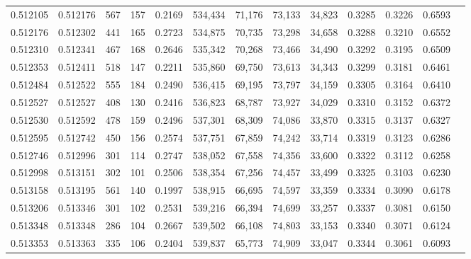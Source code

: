 \begin{tabular}{rrrrrrrrrrrrr}
0.512105 & 0.512176 &   567 &   157 &                                     0.2169 & 534,434 &  71,176 &  73,133 &  34,823 & 0.3285 & 0.3226 & 0.6593 \\
0.512176 & 0.512302 &   441 &   165 &                                     0.2723 & 534,875 &  70,735 &  73,298 &  34,658 & 0.3288 & 0.3210 & 0.6552 \\
0.512310 & 0.512341 &   467 &   168 &                                     0.2646 & 535,342 &  70,268 &  73,466 &  34,490 & 0.3292 & 0.3195 & 0.6509 \\
0.512353 & 0.512411 &   518 &   147 &                                     0.2211 & 535,860 &  69,750 &  73,613 &  34,343 & 0.3299 & 0.3181 & 0.6461 \\
0.512484 & 0.512522 &   555 &   184 &                                     0.2490 & 536,415 &  69,195 &  73,797 &  34,159 & 0.3305 & 0.3164 & 0.6410 \\
0.512527 & 0.512527 &   408 &   130 &                                     0.2416 & 536,823 &  68,787 &  73,927 &  34,029 & 0.3310 & 0.3152 & 0.6372 \\
0.512530 & 0.512592 &   478 &   159 &                                     0.2496 & 537,301 &  68,309 &  74,086 &  33,870 & 0.3315 & 0.3137 & 0.6327 \\
0.512595 & 0.512742 &   450 &   156 &                                     0.2574 & 537,751 &  67,859 &  74,242 &  33,714 & 0.3319 & 0.3123 & 0.6286 \\
0.512746 & 0.512996 &   301 &   114 &                                     0.2747 & 538,052 &  67,558 &  74,356 &  33,600 & 0.3322 & 0.3112 & 0.6258 \\
0.512998 & 0.513151 &   302 &   101 &                                     0.2506 & 538,354 &  67,256 &  74,457 &  33,499 & 0.3325 & 0.3103 & 0.6230 \\
0.513158 & 0.513195 &   561 &   140 &                                     0.1997 & 538,915 &  66,695 &  74,597 &  33,359 & 0.3334 & 0.3090 & 0.6178 \\
0.513206 & 0.513346 &   301 &   102 &                                     0.2531 & 539,216 &  66,394 &  74,699 &  33,257 & 0.3337 & 0.3081 & 0.6150 \\
0.513348 & 0.513348 &   286 &   104 &                                     0.2667 & 539,502 &  66,108 &  74,803 &  33,153 & 0.3340 & 0.3071 & 0.6124 \\
0.513353 & 0.513363 &   335 &   106 &                                     0.2404 & 539,837 &  65,773 &  74,909 &  33,047 & 0.3344 & 0.3061 & 0.6093 \\

\end{tabular}
